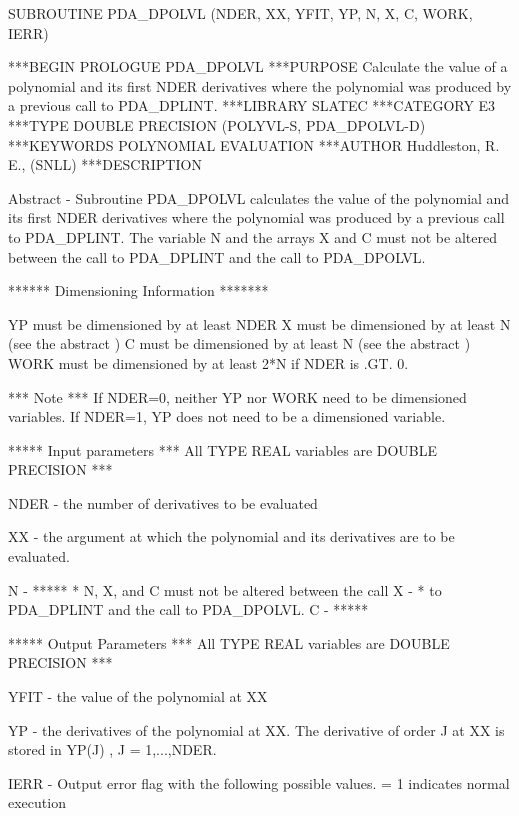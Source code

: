 \documentclass[11pt,twoside,nolof]{starlink}
\begin{document}
\begin{terminalv}
      SUBROUTINE PDA_DPOLVL (NDER, XX, YFIT, YP, N, X, C, WORK, IERR)


***BEGIN PROLOGUE  PDA_DPOLVL
***PURPOSE  Calculate the value of a polynomial and its first NDER
            derivatives where the polynomial was produced by a previous
            call to PDA_DPLINT.
***LIBRARY   SLATEC
***CATEGORY  E3
***TYPE      DOUBLE PRECISION (POLYVL-S, PDA_DPOLVL-D)
***KEYWORDS  POLYNOMIAL EVALUATION
***AUTHOR  Huddleston, R. E., (SNLL)
***DESCRIPTION

     Abstract -
        Subroutine PDA_DPOLVL calculates the value of the polynomial and
     its first NDER derivatives where the polynomial was produced by
     a previous call to PDA_DPLINT.
        The variable N and the arrays X and C must not be altered
     between the call to PDA_DPLINT and the call to PDA_DPOLVL.

     ******  Dimensioning Information *******

     YP   must be dimensioned by at least NDER
     X    must be dimensioned by at least N (see the abstract )
     C    must be dimensioned by at least N (see the abstract )
     WORK must be dimensioned by at least 2*N if NDER is .GT. 0.

     *** Note ***
       If NDER=0, neither YP nor WORK need to be dimensioned variables.
       If NDER=1, YP does not need to be a dimensioned variable.


     *****  Input parameters
       ***  All TYPE REAL variables are DOUBLE PRECISION ***

     NDER - the number of derivatives to be evaluated

     XX   - the argument at which the polynomial and its derivatives
            are to be evaluated.

     N    - *****
            *       N, X, and C must not be altered between the call
     X    - *       to PDA_DPLINT and the call to PDA_DPOLVL.
     C    - *****


     *****  Output Parameters
       ***  All TYPE REAL variables are DOUBLE PRECISION ***

     YFIT - the value of the polynomial at XX

     YP   - the derivatives of the polynomial at XX.  The derivative of
            order J at XX is stored in  YP(J) , J = 1,...,NDER.

     IERR - Output error flag with the following possible values.
          = 1  indicates normal execution


\end{terminalv}
\end{document}
